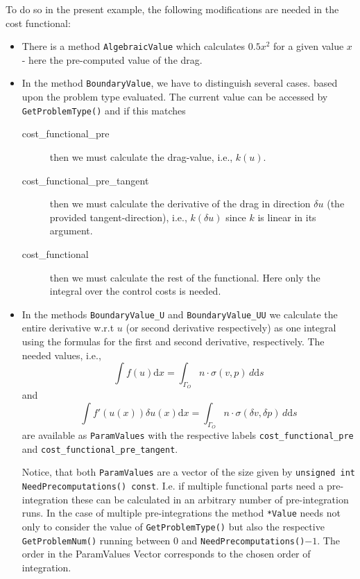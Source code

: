 To do so in the present example, the following modifications are needed in the cost functional:
\begin{itemize}
\item There is a method \texttt{AlgebraicValue} which calculates $0.5 x^2$ for a given value $x$
- here the pre-computed value of the drag.
\item In the method \texttt{BoundaryValue}, we have to distinguish several cases.
  based upon the problem type evaluated. The current value can be accessed by
  \texttt{GetProblemType()} and if this matches
  \begin{description}
    \item[cost\_functional\_pre] then we must calculate the drag-value, i.e., $k(u)$.
    \item[cost\_functional\_pre\_tangent] then we must calculate the derivative of 
      the drag in direction $\delta u$ (the provided tangent-direction), i.e., $k(\delta u)$ 
      since $k$ is linear in its argument.
    \item[cost\_functional] then we must calculate the rest of the functional. Here only the integral
      over the control costs is needed.
  \end{description}
\item In the methods \texttt{BoundaryValue\_U} and \texttt{BoundaryValue\_UU} we calculate
  the entire derivative w.r.t $u$ (or second derivative respectively) as one integral 
  using the formulas for the first and second derivative, respectively. The needed
  values, i.e.,
  \[
  \int f(u)\mathrm{d}x = \int_{\Gamma_O} n \cdot \sigma(v,p)\,d \mathrm{d}s 
  \]
  and 
  \[
  \int f'(u(x)) \delta u(x) \mathrm{d}x = \int_{\Gamma_O} n \cdot \sigma(\delta v,\delta p)\,d \mathrm{d}s 
  \]
  are available as \texttt{ParamValues} with the respective labels 
  \texttt{cost\_functional\_pre} and \texttt{cost\_functional\_pre\_tangent}.

  Notice, that both \texttt{ParamValues} are a vector of the size given 
  by \texttt{unsigned int NeedPrecomputations() const}. I.e. if multiple functional parts 
  need a pre-integration these can be calculated in an arbitrary number of pre-integration runs.
  In the case of multiple pre-integrations the method \texttt{*Value} needs not only to
  consider the value of \texttt{GetProblemType()} but also the respective \texttt{GetProblemNum()}
  running between $0$ and \texttt{NeedPrecomputations()}$-1$. 
  The order in the ParamValues Vector corresponds to the chosen order of integration.
\end{itemize}
